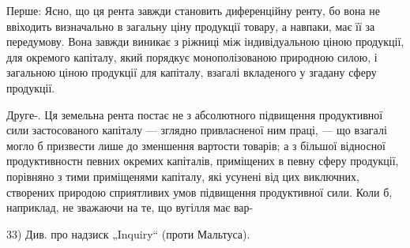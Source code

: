 Перше: Ясно, що ця рента завжди становить диференційну ренту, бо
вона не ввіходить визначально в загальну ціну продукції товару, а навпаки,
має її за передумову. Вона завжди виникає з ріжниці між індивідуальною
ціною продукції, для окремого капіталу, який порядкує монополізованою природною
силою, і загальною ціною продукції для капіталу, взагалі вкладеного у згадану
сферу продукції.

Друге-. Ця земельна рента постає не з абсолютного підвищення продуктивної
сили застосованого капіталу — зглядно привласненої ним праці, —
що взагалі могло б призвести лише до зменшення вартости товарів; а
з більшої відносної продуктивностн певних окремих капіталів, приміщених
в певну сферу продукції, порівняно з тими приміщенями капіталу, які усунені
від цих виключних, створених природою сприятливих умов підвищення
продуктивної сили. Коли б, наприклад, не зважаючи на те, що вугілля має вар-

33) Див. про надзиск „Inquiry“ (проти Мальтуса).
